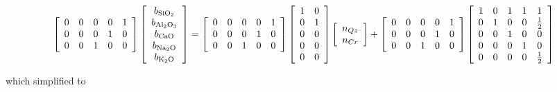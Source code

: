 \documentclass[11pt, titlepage, twoside]{article}
\begin{document}
\begin{MPEquation}[!ht]
\begin{equation}
\left[ {\begin{array}{*{20}{c}}
0&0&0&0&1\\
0&0&0&1&0\\
0&0&1&0&0
\end{array}} \right]\left[ {\begin{array}{*{20}{c}}
{{b_{{\rm{Si}}{{\rm{O}}_2}}}}\\
{{b_{{\rm{A}}{{\rm{l}}_2}{{\rm{O}}_3}}}}\\
{{b_{{\rm{CaO}}}}}\\
{{b_{{\rm{N}}{{\rm{a}}_2}{\rm{O}}}}}\\
{{b_{{{\rm{K}}_2}{\rm{O}}}}}
\end{array}} \right] = \left[ {\begin{array}{*{20}{c}}
0&0&0&0&1\\
0&0&0&1&0\\
0&0&1&0&0
\end{array}} \right]\left[ {\begin{array}{*{20}{c}}
1&0\\
0&1\\
0&0\\
0&0\\
0&0
\end{array}} \right]\left[ {\begin{array}{*{20}{c}}
{{n_{Qz}}}\\
{{n_{Cr}}}
\end{array}} \right] + \left[ {\begin{array}{*{20}{c}}
0&0&0&0&1\\
0&0&0&1&0\\
0&0&1&0&0
\end{array}} \right]\left[ {\begin{array}{*{20}{c}}
1&0&1&1&1\\
0&1&0&0&{\frac{1}{2}}\\
0&0&1&0&0\\
0&0&0&1&0\\
0&0&0&0&{\frac{1}{2}}
\end{array}} \right]
\end{equation}
\label{MPEquationElement:79A70C20-7037-4509-8A1A-85074ED3EE43}
\end{MPEquation}
which simplified to
\end{document}
